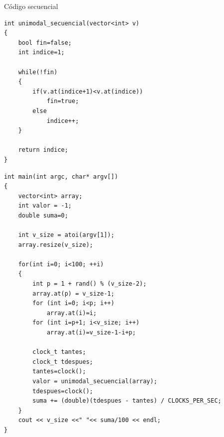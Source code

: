 \documentclass[12pt]{beamer}
\begin{document}
\begin{frame}[fragile]{Código secuencial}
	\begin{lstlisting}
int unimodal_secuencial(vector<int> v)
{
	bool fin=false;
  	int indice=1;

  	while(!fin)
  	{
     	if(v.at(indice+1)<v.at(indice))
      		fin=true;
     	else
      		indice++;
  	}

  	return indice;
}
	\end{lstlisting}
\end{frame}

\begin{frame}[fragile]
	\begin{lstlisting}
int main(int argc, char* argv[])
{
	vector<int> array;
  	int valor = -1;
	double suma=0;

  	int v_size = atoi(argv[1]);
  	array.resize(v_size);

	for(int i=0; i<100; ++i)
	{
		int p = 1 + rand() % (v_size-2);
  		array.at(p) = v_size-1;
  		for (int i=0; i<p; i++)
  			array.at(i)=i;
  		for (int i=p+1; i<v_size; i++)
  			array.at(i)=v_size-1-i+p;

  		clock_t tantes;
  		clock_t tdespues;
  		tantes=clock();
  		valor = unimodal_secuencial(array);
  		tdespues=clock();
		suma += (double)(tdespues - tantes) / CLOCKS_PER_SEC;
	}
  	cout << v_size <<" "<< suma/100 << endl;
}
	\end{lstlisting}

\end{frame}
\end{document}
